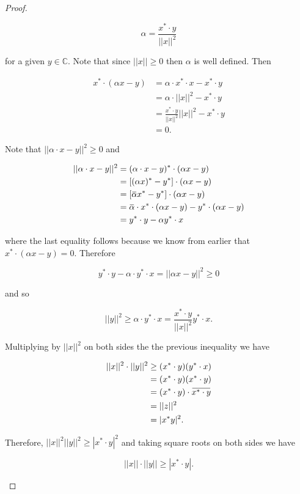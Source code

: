 \documentclass[12pt]{article}
\newcommand{\overbar}[1]{\mkern 1.5mu\overline{\mkern-1.5mu#1\mkern-1.5mu}\mkern 1.5mu}
\theoremstyle{definition}
\begin{document}
\begin{proof}
\begin{enumerate}[label = (\arabic*)]
\[
\alpha = \frac{x^* \cdot y}{|| x ||^2} 
\]

for a given $y \in \mathbb{C}$. Note that since $|| x || \geq 0$ then $\alpha$ is well defined.
Then

\begin{align*}
x^* \cdot (\alpha x - y) &= \alpha \cdot x^* \cdot x - x^* \cdot y \\
&= \alpha \cdot || x ||^2 - x^* \cdot y \\
&= \frac{x^* \cdot y}{|| x ||^2} ||x||^2 - x^* \cdot y \\
&= 0.
\end{align*}

Note that $|| \alpha \cdot x - y ||^2 \geq 0$ and

\begin{align*}
||\alpha \cdot x - y||^2 &= (\alpha \cdot x - y)^* \cdot (\alpha x - y) \\
&= [(\alpha x)^* - y^*] \cdot (\alpha x - y) \\
&= [\overbar{\alpha} x^* - y^*] \cdot (\alpha x - y) \\
&= \overbar{\alpha} \cdot x^* \cdot (\alpha x - y) - y^* \cdot (\alpha x - y) \\
&= y^* \cdot y - \alpha y^* \cdot x
\end{align*}

where the last equality follows because we know from earlier that $x^* \cdot (\alpha x - y) = 0$.
Therefore

\[y^* \cdot y - \alpha \cdot y^* \cdot x = || \alpha x - y ||^2 \geq 0 \]

and so

\[||y||^2 \geq \alpha \cdot y^* \cdot x = \frac{x^* \cdot y}{||x||^2} y^* \cdot x.\]

Multiplying by $||x||^2$ on both sides the the previous inequality we have

\begin{align*}
||x||^2 \cdot ||y||^2 &\geq (x^* \cdot y)(y^* \cdot x) \\
&= (x^* \cdot y) (x^* \cdot y) \\
&= (x^* \cdot y) \cdot \overbar{x^* \cdot y} \\
&= ||z||^2 \\
&= |x^* y|^2.
\end{align*}

Therefore, $||x||^2 ||y||^2 \geq |x^* \cdot y|^2$ and taking square roots on both sides we have

\[ ||x|| \cdot ||y|| \geq |x^* \cdot y|. \]



\end{enumerate}
\end{proof}
\end{document}
